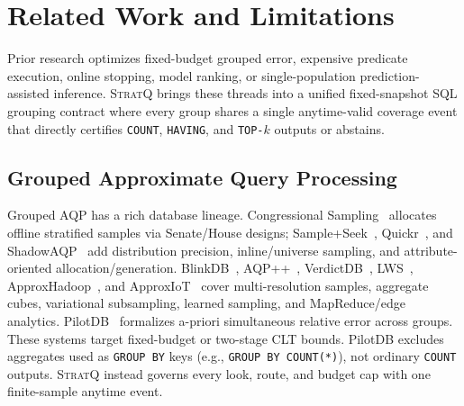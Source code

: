 \section{Related Work and Limitations}
\label{sec:related}

Prior research optimizes fixed-budget grouped error, expensive predicate execution, online stopping, model ranking, or single-population prediction-assisted inference.
\textsc{StratQ} brings these threads into a unified fixed-snapshot SQL grouping contract where every group shares a single anytime-valid coverage event that directly certifies \texttt{COUNT}, \texttt{HAVING}, and \texttt{TOP-$k$} outputs or abstains.

\subsection{Grouped Approximate Query Processing}
Grouped AQP has a rich database lineage. Congressional Sampling~\cite{acharya2000congress} allocates offline stratified samples via Senate/House designs; Sample+Seek~\cite{sample2016}, Quickr~\cite{kandula2016quickr}, and ShadowAQP~\cite{shadow2023} add distribution precision, inline/universe sampling, and attribute-oriented allocation/generation. BlinkDB~\cite{agarwal2013blinkdb}, AQP++~\cite{peng2018aqpplus}, VerdictDB~\cite{park2018verdict}, LWS~\cite{walenz2019lws}, ApproxHadoop~\cite{goiri2015approxhadoop}, and ApproxIoT~\cite{wen2018approxiot} cover multi-resolution samples, aggregate cubes, variational subsampling, learned sampling, and MapReduce/edge analytics.
PilotDB~\cite{zhu2025pilotdb} formalizes a-priori simultaneous relative error across groups. These systems target fixed-budget or two-stage CLT bounds. PilotDB excludes aggregates used as \texttt{GROUP BY} keys (e.g., \texttt{GROUP BY COUNT(*)}), not ordinary \texttt{COUNT} outputs. \textsc{StratQ} instead governs every look, route, and budget cap with one finite-sample anytime event.

